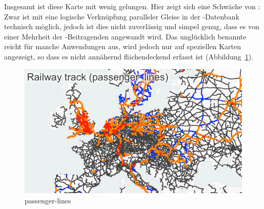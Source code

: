 \documentclass[../main/thesis.tex]{subfiles}
\begin{document}
Insgesamt ist diese Karte mit  wenig gelungen.
Hier zeigt sich eine Schwäche von \osm: Zwar ist mit  eine logische Verknüpfung paralleler Gleise in der \osm-Datenbank technisch möglich, jedoch ist dies nicht zuverlässig und simpel genug, dass es von einer Mehrheit der \osm-Beitragenden angewandt wird.
Das unglücklich benannte  reicht für manche Anwendungen aus, wird jedoch nur auf speziellen Karten angezeigt,
so dass es nicht annähernd flächendeckend erfasst ist (Abbildung~\ref{fig:passenger_lines}).

\begin{figure}[ht]
  \begin{minipage}[t]{.5\linewidth}
    \centering
    \includegraphics[width=\ScaleIfNeeded]{../chapter2/passenger_lines-europe}
    \caption{passenger-lines}\label{fig:passenger_lines}
  \end{minipage}%
  \begin{minipage}[t]{.5\linewidth}
    \centering
  \end{minipage}
\end{figure}




\end{document}
